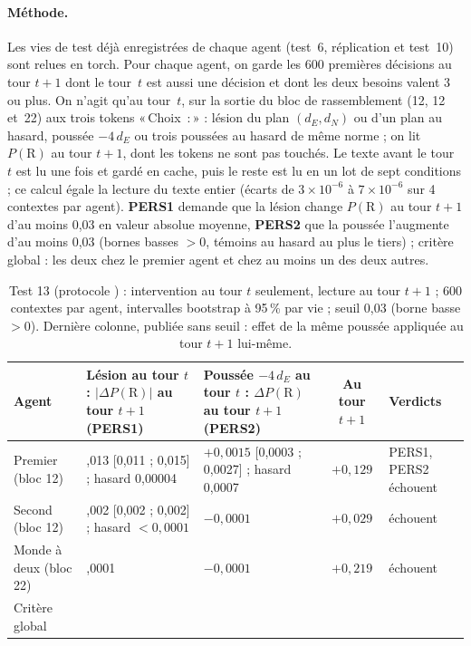 \documentclass[11pt,a4paper]{article}
\newcommand{\Choix}{«\,Choix~:\,»}
\newcommand{\dE}{d_{E}}
\newcommand{\dN}{d_{N}}
\newcommand{\code}[1]{\texttt{\detokenize{#1}}}
\begin{document}
\paragraph{Méthode.} Les vies de test déjà enregistrées de chaque agent (test~6,
réplication et test~10) sont relues en torch. Pour chaque agent, on garde les 600
premières décisions au tour $t+1$ dont le tour~$t$ est aussi une décision et dont les
deux besoins valent 3 ou plus. On n'agit qu'au tour~$t$, sur la sortie du bloc de
rassemblement (12, 12 et~22) aux trois tokens \Choix{} : lésion du plan $(\dE,\dN)$ ou
d'un plan au hasard, poussée $-4\,\dE$ ou trois poussées au hasard de même norme ; on
lit $P(\mathrm R)$ au tour $t+1$, dont les tokens ne sont pas touchés. Le texte avant
le tour~$t$ est lu une fois et gardé en cache, puis le reste est lu en un lot de sept
conditions ; ce calcul égale la lecture du texte entier (écarts de $3\times10^{-6}$ à
$7\times10^{-6}$ sur 4 contextes par agent). \textbf{PERS1} demande que la lésion
change $P(\mathrm R)$ au tour $t+1$ d'au moins 0,03 en valeur absolue moyenne,
\textbf{PERS2} que la poussée l'augmente d'au moins 0,03 (bornes basses $>0$, témoins
au hasard au plus le tiers) ; critère global : les deux chez le premier agent et chez
au moins un des deux autres.

\begin{table}[t]
\centering
\caption{Test 13 (protocole \code{75fda95}) : intervention au tour $t$ seulement,
lecture au tour $t+1$ ; 600 contextes par agent, intervalles bootstrap à 95\,\% par
vie ; seuil 0,03 (borne basse $>0$). Dernière colonne, publiée sans seuil : effet de
la même poussée appliquée au tour $t+1$ lui-même.}
\label{tab-t13}
\small
\begin{tabularx}{\textwidth}{@{}>{\raggedright\arraybackslash}p{2.75cm} >{\raggedright\arraybackslash}X >{\raggedright\arraybackslash}X c >{\raggedright\arraybackslash}p{2.0cm}@{}}
\toprule
Agent & Lésion au tour $t$ : $|\Delta P(\mathrm R)|$ au tour $t+1$ (PERS1) & Poussée $-4\,\dE$ au tour $t$ : $\Delta P(\mathrm R)$ au tour $t+1$ (PERS2) & Au tour $t+1$ & Verdicts \\
\midrule
Premier (bloc 12) & 0,013 [0,011 ; 0,015] ; hasard 0,00004 & $+0,0015$ [0,0003 ; 0,0027] ; hasard 0,0007 & $+0,129$ & PERS1, PERS2 échouent \\
Second (bloc 12) & 0,002 [0,002 ; 0,002] ; hasard $<0,0001$ & $-0,0001$ & $+0,029$ & échouent \\
Monde à deux (bloc 22) & 0,0001 & $-0,0001$ & $+0,219$ & échouent \\
\midrule
Critère global & \multicolumn{4}{l}{non satisfait} \\
\bottomrule
\end{tabularx}
\end{table}
\end{document}
